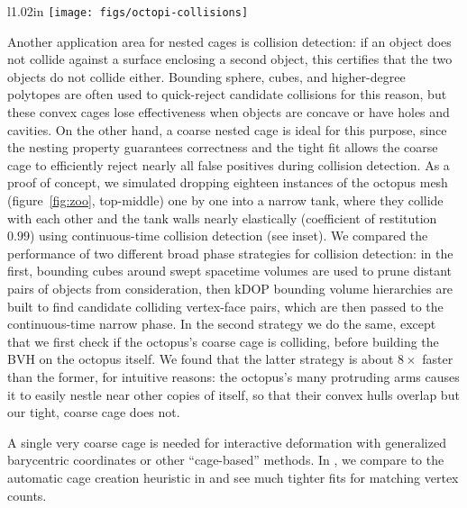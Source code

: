 %
\begin{wrapfigure}{l}{1.02in}
%
\centering
%
\texttt{[image: figs/octopi-collisions]}
%
\end{wrapfigure}
%
Another application area for nested cages is collision detection: if an object does not collide against a surface enclosing a second object, this certifies that the two objects do not collide either. Bounding sphere, cubes, and higher-degree polytopes are often used to quick-reject candidate collisions for this reason, but these convex cages lose effectiveness when objects are concave or have holes and cavities. On the other hand, a coarse nested cage is ideal for this purpose, since the nesting property guarantees correctness and the tight fit allows the coarse cage to efficiently reject nearly all false positives during collision detection. As a proof of concept, we simulated dropping eighteen instances of the octopus mesh (figure~\ref{fig:zoo}, top-middle) one by one into a narrow tank, where they collide with each other and the tank walls nearly elastically (coefficient of restitution $0.99$) using continuous-time collision detection (see inset). We compared the performance of two different broad phase strategies for collision detection: in the first, bounding cubes around swept spacetime volumes are used to prune distant pairs of objects from consideration, then kDOP bounding volume hierarchies are built to find candidate colliding vertex-face pairs, which are then passed to the continuous-time narrow phase. In the second strategy we do the same, except that we first check if the octopus's coarse cage is colliding, before building the BVH on the octopus itself. We found that the latter strategy is about $8\times$ faster than the former, for intuitive reasons: the octopus's many protruding arms causes it to easily nestle near other copies of itself, so that their convex hulls overlap but our tight, coarse cage does not.

A single very coarse cage is needed for interactive deformation with
generalized barycentric coordinates or other ``cage-based'' methods.
%
In , we compare to the automatic cage creation
heuristic in \cite{Ben-Chen:2009:SDT} and see much tighter fits for matching
vertex counts.

